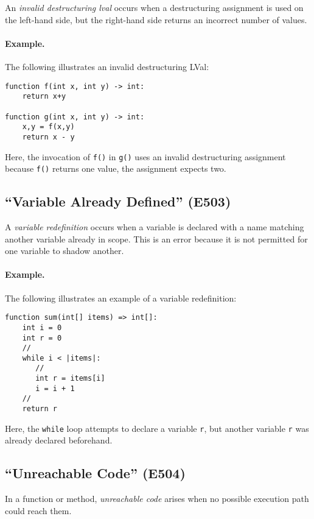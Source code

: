 An {\em invalid destructuring lval} occurs when a destructuring assignment is used on the left-hand side, but the right-hand side returns an incorrect number of values.

\paragraph{Example.}  The following illustrates an invalid destructuring LVal:

\begin{lstlisting}
function f(int x, int y) -> int:
    return x+y

function g(int x, int y) -> int:
    x,y = f(x,y)
    return x - y
\end{lstlisting}

Here, the invocation of \lstinline{f()} in \lstinline{g()} uses an invalid destructuring assignment because \lstinline{f()} returns one value, the assignment expects two.

\subsection{``Variable Already Defined'' (E503)}

A {\em variable redefinition} occurs when a variable is declared with a name matching another variable already in scope.  This is an error because it is not permitted for one variable to shadow another.

\paragraph{Example.}  The following illustrates an example of a variable redefinition:

\begin{lstlisting}
function sum(int[] items) => int[]:
    int i = 0
    int r = 0
    //
    while i < |items|:
       //
       int r = items[i]
       i = i + 1
    //
    return r
\end{lstlisting}

Here, the \lstinline{while} loop attempts to declare a variable \lstinline{r}, but another variable \lstinline{r} was already declared beforehand.

\subsection{``Unreachable Code'' (E504)}

In a function or method, {\em unreachable code} arises when no possible execution path could reach them.  

